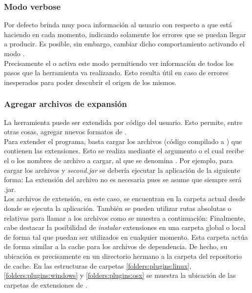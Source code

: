 \subsubsection{Modo verbose}
\label{subsubsec:guide:verbose}

Por defecto \fronttier brinda muy poca información al usuario con respecto a
que está haciendo en cada momento, indicando solamente los errores que se 
puedan llegar a producir. Es posible, sin embargo, cambiar dicho comportamiento 
activando el modo .\\
Precisamente el \flag {} o  activa este modo 
permitiendo ver información de todos los pasos que la herramienta va 
realizando. Esto resulta útil en caso de errores inesperados para poder 
descubrir el origen de los mismos.\\


\subsubsection{Agregar archivos de expansión}
\label{subsubsec:guide:expand}

La herramienta \fronttier puede ser extendida por código del usuario. Esto 
permite, entre otras cosas, agregar nuevos formatos de \conffile.\\
Para extender el programa, basta cargar los archivos \jar (código compilado a
\bytecode \java) que contienen las extensiones. Esto se realiza mediante el 
argumento  o  el cual recibe el o los nombres de 
archivo a cargar, al que se denomina \plugin. Por ejemplo, para cargar los 
archivos  y \emph{second.jar} se debería ejecutar la 
aplicación de la siguiente forma:
La extensión del archivo no es necesaria pues se asume que siempre será .jar.\\
Los archivos de extensión, en este caso, se encuentran en la carpeta actual
desde donde se ejecuta la aplicación. También se pueden utilizar rutas
absolutas o relativas para llamar a los archivos como se muestra a continuación:
Finalmente, cabe destacar la posibilidad de \emph{instalar} extensiones en
una carpeta global o local de forma tal que puedan ser utilizados en cualquier
momento. Esta carpeta actúa de forma similar a la cache para los archivos
de dependencia. De hecho, su ubicación es precisamente en un directorio hermano
a la carpeta del repositorio de cache. En las estructuras de carpetas
\ref{folders:plugins:linux}, \ref{folders:plugins:windows} y 
\ref{folders:plugins:osx} se muestra la ubicación de las carpetas de 
extensiones de \fronttier.

